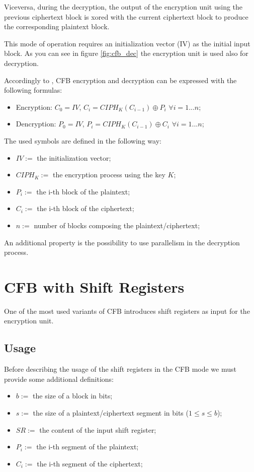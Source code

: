 \documentclass[11pt]{article}
\newcommand\CIPH{C\!I\!P\!H_K}
\begin{document}
Viceversa, during the decryption, the output of the encryption unit using the previous ciphertext block is xored with the current ciphertext block to produce the corresponding plaintext block.

This mode of operation requires an initialization vector (IV) as the initial input block. As you can see in figure \ref{fig:cfb_dec} the encryption unit is used also for decryption.

Accordingly to \cite{wiki}, CFB encryption and decryption can be expressed with the following formulas:

\begin{itemize}
\item Encryption: $C_0 = IV$, $C_i = \CIPH(C_{i-1}) \oplus P_i$ $\forall i = 1...n$;
\item Dencryption: $P_0 = IV$, $P_i = \CIPH(C_{i-1}) \oplus C_i$ $\forall i = 1...n$;
\end{itemize}

The used symbols are defined in the following way:

\begin{itemize}
\item $IV := $ the initialization vector;
\item $\CIPH := $ the encryption process using the key $K$;
\item $P_i := $ the i-th block of the plaintext;
\item $C_i := $ the i-th block of the ciphertext;
\item $n := $ number of blocks composing the plaintext/ciphertext;
\end{itemize}

An additional property is the possibility to use parallelism in the decryption process. 

\section{CFB with Shift Registers}

One of the most used variants of CFB introduces shift registers as input for the encryption unit.

\subsection{Usage}

Before describing the usage of the shift registers in the CFB mode we must provide some additional definitions:

\begin{itemize}
\item $b := $ the size of a block in bits;
\item $s := $ the size of a plaintext/ciphertext segment in bits ($1 \le s \le b$);
\item $SR := $ the content of the input shift register;
\item $P_i := $ the i-th segment of the plaintext;
\item $C_i := $ the i-th segment of the ciphertext;
\end{itemize}
\end{document}
